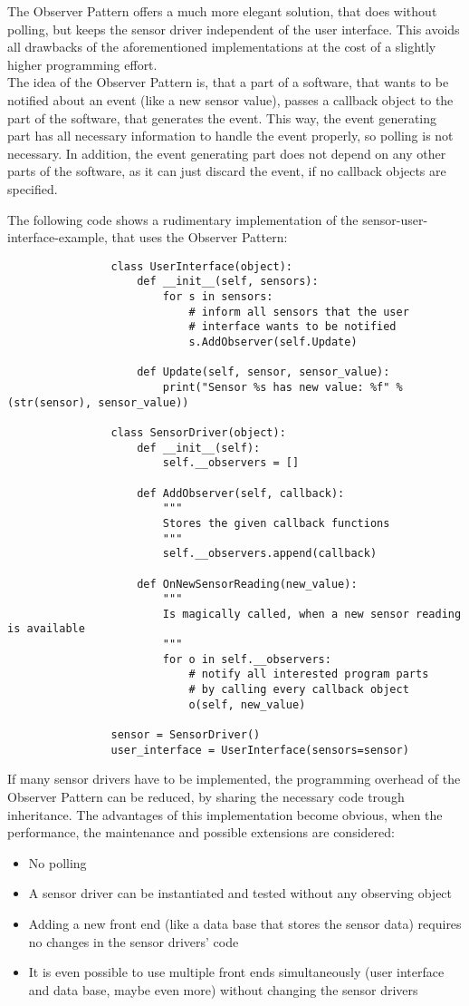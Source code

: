 			The Observer Pattern offers a much more elegant solution, that does without polling, but keeps the sensor driver independent of the user interface.
			This avoids all drawbacks of the aforementioned implementations at the cost of a slightly higher programming effort.\\
			The idea of the Observer Pattern is, that a part of a software, that wants to be notified about an event (like a new sensor value), passes a callback object to the part of the software, that generates the event.
			This way, the event generating part has all necessary information to handle the event properly, so polling is not necessary.
			In addition, the event generating part does not depend on any other parts of the software, as it can just discard the event, if no callback objects are specified.

			The following code shows a rudimentary implementation of the sensor-user-interface-example, that uses the Observer Pattern:
			\begin{verbatim}
				class UserInterface(object):
					def __init__(self, sensors):
						for s in sensors:
							# inform all sensors that the user
							# interface wants to be notified
							s.AddObserver(self.Update)

					def Update(self, sensor, sensor_value):
						print("Sensor %s has new value: %f" % (str(sensor), sensor_value))

				class SensorDriver(object):
					def __init__(self):
						self.__observers = []
				
					def AddObserver(self, callback):
						"""
						Stores the given callback functions
						"""
						self.__observers.append(callback)

					def OnNewSensorReading(new_value):
						"""
						Is magically called, when a new sensor reading is available
						"""
						for o in self.__observers:
							# notify all interested program parts
							# by calling every callback object
							o(self, new_value)

				sensor = SensorDriver()
				user_interface = UserInterface(sensors=sensor)
			\end{verbatim}
			If many sensor drivers have to be implemented, the programming overhead of the Observer Pattern can be reduced, by sharing the necessary code trough inheritance.
			The advantages of this implementation become obvious, when the performance, the maintenance and possible extensions are considered:
			\begin{itemize}
				\item No polling
				\item A sensor driver can be instantiated and tested without any observing object
				\item Adding a new front end (like a data base that stores the sensor data) requires no changes in the sensor drivers' code
				\item It is even possible to use multiple front ends simultaneously (user interface and data base, maybe even more) without changing the sensor drivers
			\end{itemize}

